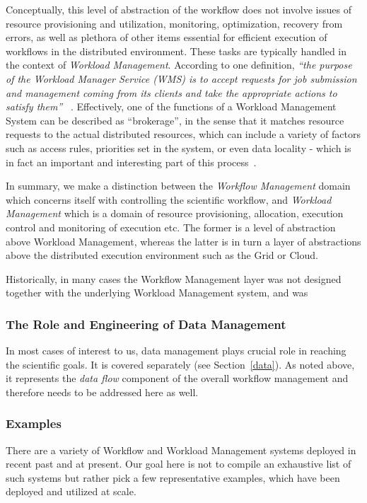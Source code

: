 Conceptually, this level of abstraction of the workflow does not  involve issues of resource provisioning and utilization, monitoring, optimization, recovery from errors, as well as plethora of other items essential
for efficient execution of workflows in the distributed environment. These tasks are typically handled in the context of \textit{Workload Management}. According to one definition, \textit{``the purpose of the Workload Manager Service (WMS) is to accept requests for job submission and
management coming from its clients and take the appropriate actions to satisfy them''} ~\cite{egee_user_guide}. Effectively, one of the functions of a Workload Management System can be described as ``brokerage'', in the sense that it matches resource requests to the actual distributed resources, which can include a variety of factors such as access rules, priorities set in the system, or even data locality - which is in fact an important and interesting part of this process~\cite{panda_chep11}.

In summary, we make a distinction between the \textit{Workflow Management} domain which concerns itself with controlling the scientific workflow, and \textit{Workload Management} which is a domain of resource provisioning, allocation, execution control and monitoring of execution etc. The former is a level of abstraction above Workload Management, whereas the latter is in turn a layer of abstractions above the distributed execution environment such as the Grid or Cloud.

Historically, in many cases the Workflow Management layer was not designed together with the underlying Workload Management system, and was 

\subsubsection{The Role and Engineering of Data Management}
In most cases of interest to us, data management plays crucial role in reaching the scientific goals. It is covered separately (see Section~\ref{data}). As noted above, it represents the \textit{data flow} component of the overall workflow management and therefore needs to be addressed here as well.

\subsubsection{Examples}
\label{wms_examples}
There are a variety of Workflow and Workload Management systems deployed in recent past and at present. Our goal here is not to compile an exhaustive list of such systems but rather pick a few representative examples, which have been deployed and utilized at scale.


